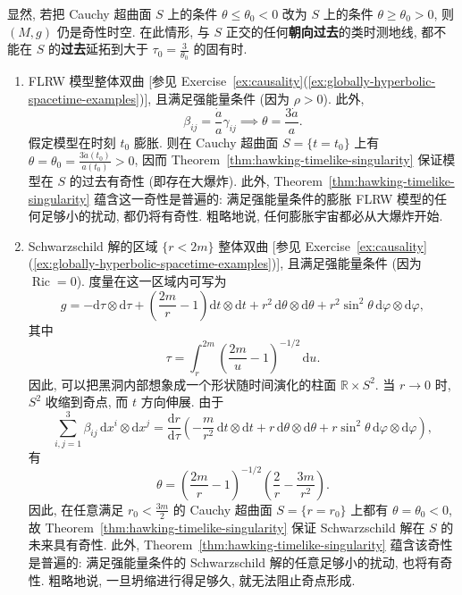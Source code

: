 \begin{RiemannRemark}\label{rem:past-timelike-incompleteness-from-positive-expansion}
显然, 若把 Cauchy 超曲面 $S$ 上的条件 $\theta\leq\theta_0<0$ 改为 $S$ 上的条件 $\theta\geq\theta_0>0$, 则 $(M,g)$ 仍是奇性时空. 在此情形, 与 $S$ 正交的任何\textbf{朝向过去}的类时测地线, 都不能在 $S$ 的\textbf{过去}延拓到大于 $\tau_0=\frac{3}{\theta_0}$ 的固有时.
\end{RiemannRemark}

\begin{RiemannExample}\label{ex:hawking-singularities-in-flrw-and-schwarzschild}
\begin{enumerate}[label=(\arabic*),ref=\arabic*,leftmargin=*]
\item FLRW 模型整体双曲 [参见 Exercise~\ref{ex:causality}(\ref{ex:globally-hyperbolic-spacetime-examples})], 且满足强能量条件 (因为 $\rho>0$). 此外,
\[
  \beta_{ij}=\frac{\dot a}{a}\gamma_{ij}\implies\theta=\frac{3\dot a}{a}.
\]
假定模型在时刻 $t_0$ 膨胀. 则在 Cauchy 超曲面 $S=\{t=t_0\}$ 上有 $\theta=\theta_0=\frac{3\dot a(t_0)}{a(t_0)}>0$, 因而 Theorem~\ref{thm:hawking-timelike-singularity} 保证模型在 $S$ 的过去有奇性 (即存在大爆炸). 此外, Theorem~\ref{thm:hawking-timelike-singularity} 蕴含这一奇性是普遍的: 满足强能量条件的膨胀 FLRW 模型的任何足够小的扰动, 都仍将有奇性. 粗略地说, 任何膨胀宇宙都必从大爆炸开始.
\item Schwarzschild 解的区域 $\{r<2m\}$ 整体双曲 [参见 Exercise~\ref{ex:causality}(\ref{ex:globally-hyperbolic-spacetime-examples})], 且满足强能量条件 (因为 $\operatorname{Ric}=0$). 度量在这一区域内可写为
\[
  g=-\mathrm{d}\tau\otimes\mathrm{d}\tau
    +\left(\frac{2m}{r}-1\right)\mathrm{d}t\otimes\mathrm{d}t
    +r^2\,\mathrm{d}\theta\otimes\mathrm{d}\theta
    +r^2\sin^2\theta\,\mathrm{d}\varphi\otimes\mathrm{d}\varphi,
\]
其中
\[
  \tau=\int_r^{2m}\left(\frac{2m}{u}-1\right)^{-1/2}\,\mathrm{d}u.
\]
因此, 可以把黑洞内部想象成一个形状随时间演化的柱面 $\mathbb{R}\times S^2$. 当 $r\to0$ 时, $S^2$ 收缩到奇点, 而 $t$ 方向伸展. 由于
\[
  \sum_{i,j=1}^3\beta_{ij}\,\mathrm{d}x^i\otimes\mathrm{d}x^j
  =\frac{\mathrm{d}r}{\mathrm{d}\tau}
   \left(-\frac{m}{r^2}\,\mathrm{d}t\otimes\mathrm{d}t+r\,\mathrm{d}\theta\otimes\mathrm{d}\theta
     +r\sin^2\theta\,\mathrm{d}\varphi\otimes\mathrm{d}\varphi\right),
\]
有
\[
  \theta=\left(\frac{2m}{r}-1\right)^{-1/2}\left(\frac{2}{r}-\frac{3m}{r^2}\right).
\]
因此, 在任意满足 $r_0<\frac{3m}{2}$ 的 Cauchy 超曲面 $S=\{r=r_0\}$ 上都有 $\theta=\theta_0<0$, 故 Theorem~\ref{thm:hawking-timelike-singularity} 保证 Schwarzschild 解在 $S$ 的未来具有奇性. 此外, Theorem~\ref{thm:hawking-timelike-singularity} 蕴含该奇性是普遍的: 满足强能量条件的 Schwarzschild 解的任意足够小的扰动, 也将有奇性. 粗略地说, 一旦坍缩进行得足够久, 就无法阻止奇点形成.
\end{enumerate}
\end{RiemannExample}

